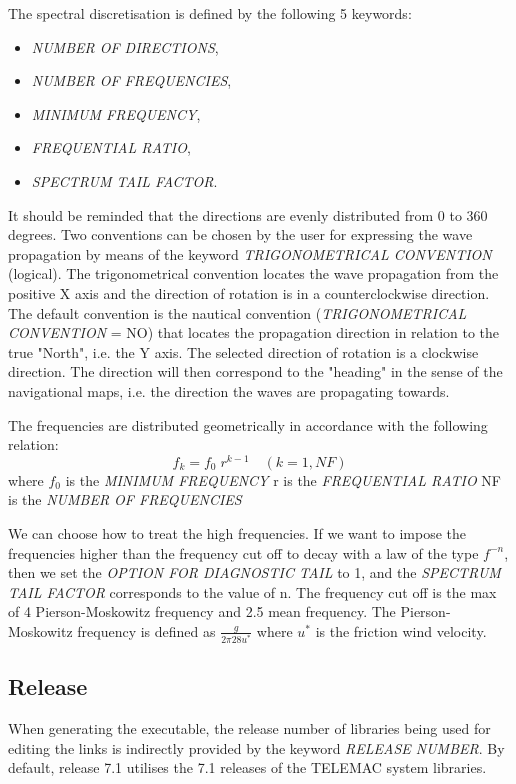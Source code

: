  The spectral discretisation is defined by the following 5 keywords:  
\begin{itemize} 
\item  \textit{NUMBER OF DIRECTIONS}, \item     \textit{NUMBER OF FREQUENCIES}, \item    \textit{MINIMUM FREQUENCY}, \item
  \textit{FREQUENTIAL RATIO}, \item    \textit{SPECTRUM TAIL FACTOR}.
\end{itemize}
It should be reminded that the directions are evenly distributed from 0 to 360 degrees. Two conventions can be chosen by the user for
expressing the wave propagation by means of the keyword \textit{TRIGONOMETRICAL CONVENTION }(logical). The trigonometrical convention
locates the wave propagation from the positive X axis and the direction of rotation is in a counterclockwise direction. The default
convention is the nautical convention (\textit{TRIGONOMETRICAL CONVENTION} = NO) that locates the propagation direction in relation
to the true "North", i.e. the Y axis. The selected direction of rotation is a clockwise direction. The direction will then correspond
to the "heading" in the sense of the navigational maps, i.e. the direction the waves are propagating towards.

 The frequencies are distributed geometrically in accordance with the following relation:
\[f_{k} =f_{0} \; r^{k-1} \quad (k=1,NF)\]
where $f_{0} $ is the \textit{MINIMUM FREQUENCY }  r is the \textit{FREQUENTIAL RATIO}   NF is the \textit{NUMBER OF FREQUENCIES}

We can choose how to treat the high frequencies. If we want to impose the frequencies higher than the frequency cut off to decay
with a law of the type $f^{-n}$, then we set the \textit{OPTION FOR DIAGNOSTIC TAIL} to 1, and the \textit{SPECTRUM TAIL FACTOR }
corresponds to the value of n. The frequency cut off is the max of 4 Pierson-Moskowitz frequency and 2.5 mean frequency. 
The Pierson-Moskowitz frequency is defined as $\frac{g}{2\pi 28 u^*}$ where $ u^*$ is the friction wind velocity.  


\subsection{ Release}

When generating the executable, the release number of libraries being used for editing the links is indirectly provided by the
keyword \textit{\tomawac RELEASE NUMBER}. By default, \tomawac release 7.1 utilises the 7.1 releases of the TELEMAC system libraries.


